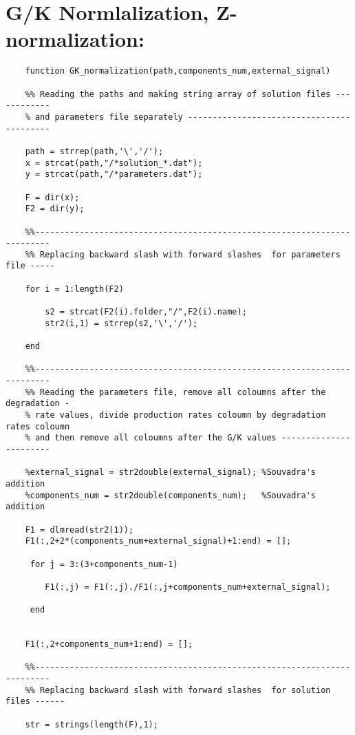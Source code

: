 \documentclass{article}
\begin{document}
\section*{G/K Normlalization, Z-normalization:} 
\begin{verbatim}
    function GK_normalization(path,components_num,external_signal)

    %% Reading the paths and making string array of solution files ------------
    % and parameters file separately ------------------------------------------
    
    path = strrep(path,'\','/');
    x = strcat(path,"/*solution_*.dat");
    y = strcat(path,"/*parameters.dat");
    
    F = dir(x);
    F2 = dir(y);
    
    %%-------------------------------------------------------------------------
    %% Replacing backward slash with forward slashes  for parameters file -----
    
    for i = 1:length(F2)
        
        s2 = strcat(F2(i).folder,"/",F2(i).name);
        str2(i,1) = strrep(s2,'\','/');
        
    end
    
    %%-------------------------------------------------------------------------
    %% Reading the parameters file, remove all coloumns after the degradation -
    % rate values, divide production rates coloumn by degradation rates coloumn
    % and then remove all coloumns after the G/K values -----------------------
    
    %external_signal = str2double(external_signal); %Souvadra's addition
    %components_num = str2double(components_num);   %Souvadra's addition
    
    F1 = dlmread(str2(1));
    F1(:,2+2*(components_num+external_signal)+1:end) = [];
    
     for j = 3:(3+components_num-1)
                   
        F1(:,j) = F1(:,j)./F1(:,j+components_num+external_signal);
        
     end
     
     
    F1(:,2+components_num+1:end) = [];
    
    %%-------------------------------------------------------------------------
    %% Replacing backward slash with forward slashes  for solution files ------
    
    str = strings(length(F),1);
    

\end{verbatim}
\end{document}
